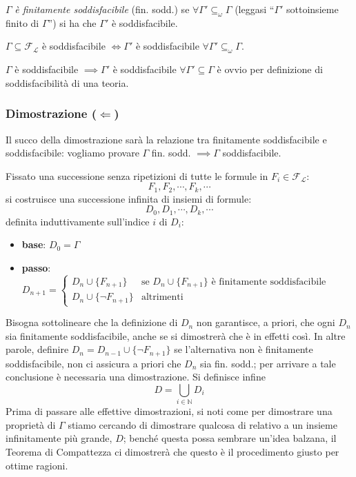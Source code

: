 \begin{defi}
        $\Gamma$ \textit{è finitamente soddisfacibile} (fin. sodd.) 
        se $\forall \Gamma' \subseteq_{\omega} \Gamma$ (leggasi ``$\Gamma '$ sottoinsieme finito di $\Gamma$'')
        si ha che $\Gamma'$ è soddisfacibile.
\end{defi}

\begin{teon}[di Compattezza]
\label{thm:compattezza-prop}
$\Gamma \subseteq \mathscr{F_L}$ è soddisfacibile $\iff \Gamma'$ è soddisfacibile $\forall \Gamma' \subseteq_{\omega} \Gamma$.
\end{teon}
$\Gamma$ è soddisfacibile $\implies \Gamma'$ è soddisfacibile $\forall \Gamma' \subseteq \Gamma$ è ovvio per definizione di soddisfacibilità di una teoria.

\subsubsection{Dimostrazione ($\Longleftarrow$)}
Il succo della dimostrazione sarà la relazione tra finitamente soddisfacibile e soddisfacibile: vogliamo provare $\Gamma$ fin. sodd. $\implies \Gamma$ soddisfacibile. 

Fissato una successione senza ripetizioni di tutte le formule in $F_i \in \mathscr{F_L}$:
$$
F_1, F_2, \cdots, F_k, \cdots
$$ 
si costruisce una successione infinita di insiemi di formule:
$$
D_0, D_1, \cdots, D_k, \cdots
$$ 
definita induttivamente sull'indice $i$ di $D_i$:
\begin{itemize}
  \item \textbf{base}: $D_0 = \Gamma$
  \item \textbf{passo}: $D_{n+1} = 
        \begin{cases} 
          D_n \cup \{F_{n+1}\} & \text{se } D_n \cup \{F_{n+1}\} \text{ è finitamente soddisfacibile} \\
          D_n \cup \{\neg F_{n+1}\} & \text{altrimenti}
        \end{cases}$
\end{itemize}


Bisogna sottolineare che la definizione di $D_n$ non garantisce, a priori, 
che ogni $D_n$ sia finitamente soddisfacibile, anche se si dimostrerà che è 
in effetti così. In altre parole, definire $D_n = D_{n-1} \cup \{\neg F_{n+1}\}$ 
se l'alternativa non è finitamente soddisfacibile, non ci assicura a priori che 
$D_n$ sia fin. sodd.; per arrivare a tale conclusione è necessaria una 
dimostrazione.
Si definisce infine
$$
D = \bigcup_{i \in \mathbb{N}} D_i
$$
Prima di passare alle effettive dimostrazioni, si noti come per dimostrare 
una proprietà di $\Gamma$ stiamo cercando di dimostrare qualcosa di relativo a 
un insieme infinitamente più grande, $D$; benché questa possa sembrare un'idea 
balzana, il Teorema di Compattezza ci dimostrerà che questo è il procedimento 
giusto per ottime ragioni. 

